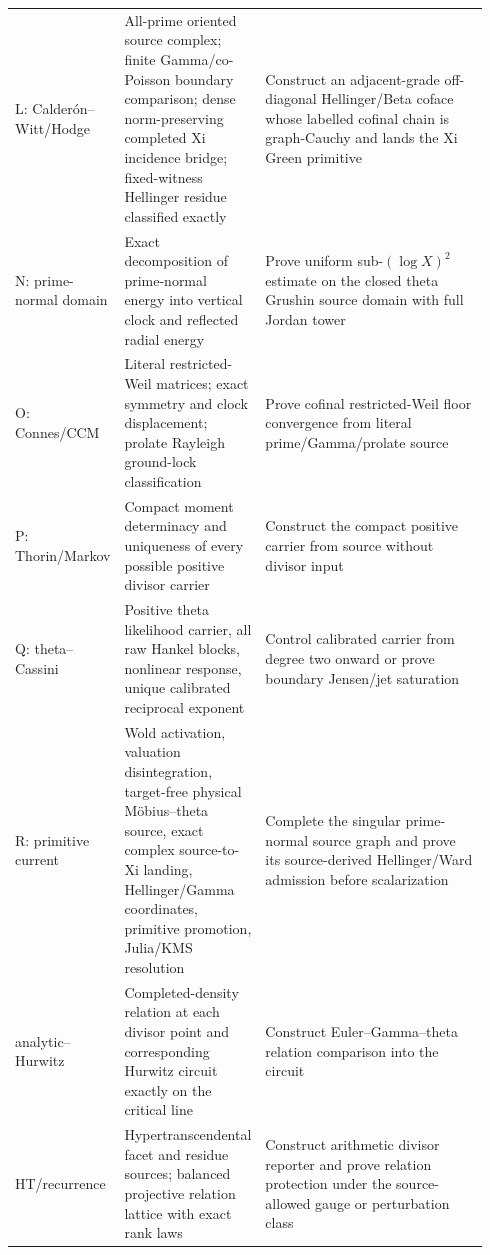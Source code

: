 \documentclass[11pt]{article}
\theoremstyle{definition}
\theoremstyle{remark}
\begin{document}
\begin{longtable}{
  >{\raggedright\arraybackslash}p{0.16\linewidth}
  >{\raggedright\arraybackslash}p{0.28\linewidth}
  >{\raggedright\arraybackslash}p{0.50\linewidth}}
L: Calder\'on--Witt/Hodge
& All-prime oriented source complex; finite Gamma/co-Poisson boundary
  comparison; dense norm-preserving completed Xi incidence bridge;
  fixed-witness Hellinger residue classified exactly
& Construct an adjacent-grade off-diagonal Hellinger/Beta coface whose
  labelled cofinal chain is graph-Cauchy and lands the Xi Green primitive\\

N: prime-normal domain
& Exact decomposition of prime-normal energy into vertical clock and
  reflected radial energy
& Prove uniform sub-\((\log X)^2\) estimate on the closed theta Grushin
  source domain with full Jordan tower\\

O: Connes/CCM
& Literal restricted-Weil matrices; exact symmetry and clock
  displacement; prolate Rayleigh ground-lock classification
& Prove cofinal restricted-Weil floor convergence from literal
  prime/Gamma/prolate source\\

P: Thorin/Markov
& Compact moment determinacy and uniqueness of every possible positive
  divisor carrier
& Construct the compact positive carrier from source without divisor
  input\\

Q: theta--Cassini
& Positive theta likelihood carrier, all raw Hankel blocks, nonlinear
  response, unique calibrated reciprocal exponent
& Control calibrated carrier from degree two onward or prove boundary
  Jensen/jet saturation\\

R: primitive current
& Wold activation, valuation disintegration, target-free physical
  M\"obius--theta source, exact complex source-to-Xi landing,
  Hellinger/Gamma coordinates, primitive promotion, Julia/KMS resolution
& Complete the singular prime-normal source graph and prove its
  source-derived Hellinger/Ward admission before scalarization\\

analytic--Hurwitz
& Completed-density relation at each divisor point and corresponding
  Hurwitz circuit exactly on the critical line
& Construct Euler--Gamma--theta relation comparison into the circuit\\

HT/recurrence
& Hypertranscendental facet and residue sources; balanced projective
  relation lattice with exact rank laws
& Construct arithmetic divisor reporter and prove relation protection
  under the source-allowed gauge or perturbation class\\
\end{longtable}
\endgroup
\end{document}
